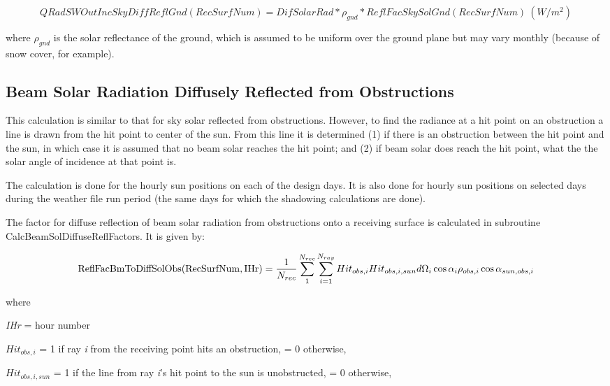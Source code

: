 \begin{equation}
QRadSWOutIncSkyDiffReflGnd(RecSurfNum) = DifSolarRad * {\rho_{gnd}} * ReflFacSkySolGnd(RecSurfNum)~ (W/m^{2})
\end{equation}

where \({\rho_{gnd}}\) is the solar reflectance of the ground, which is assumed to be uniform over the ground plane but may vary monthly (because of snow cover, for example).

\subsection{Beam Solar Radiation Diffusely Reflected from Obstructions}\label{beam-solar-radiation-diffusely-reflected-from-obstructions}

This calculation is similar to that for sky solar reflected from obstructions. However, to find the radiance at a hit point on an obstruction a line is drawn from the hit point to center of the sun. From this line it is determined (1) if there is an obstruction between the hit point and the sun, in which case it is assumed that no beam solar reaches the hit point; and (2) if beam solar does reach the hit point, what the the solar angle of incidence at that point is.

The calculation is done for the hourly sun positions on each of the design days. It is also done for hourly sun positions on selected days during the weather file run period (the same days for which the shadowing calculations are done).

The factor for diffuse reflection of beam solar radiation from obstructions onto a receiving surface is calculated in subroutine CalcBeamSolDiffuseReflFactors. It is given by:

{\scriptsize
\begin{equation}
{\rm{ReflFacBmToDiffSolObs(RecSurfNum,IHr)}} = \frac{1}{{{N_{rec}}}}\sum\limits_1^{{N_{rec}}} {\sum\limits_{i = 1}^{{N_{ray}}} {Hi{t_{obs,i}}Hi{t_{obs,i,sun}}d{\Omega_i}\cos {\alpha_i}{\rho_{obs,i}}\cos {\alpha_{sun,obs,i}}} }
\end{equation}}

where

\emph{IHr} = hour number

\(Hi{t_{obs,i}}\) = 1 if ray \emph{i} from the receiving point hits an obstruction, = 0 otherwise,

\(Hi{t_{obs,i,sun}}\) = 1 if the line from ray \emph{i}'s hit point to the sun is unobstructed, = 0 otherwise,

